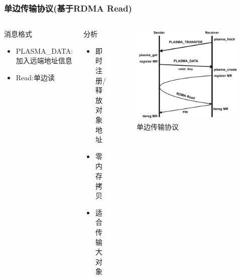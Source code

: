 \begin{frame}
	\frametitle{单边传输协议(基于RDMA Read)}
	\begin{columns}[onlytextwidth]
		\begin{block}{消息格式}
			\begin{itemize}
				\item PLASMA\_DATA:\\加入远端地址信息
				\item Read:单边读
			\end{itemize}
		\end{block}
		\begin{block}{分析}
			\begin{itemize}
				\item 即时注册/释放对象地址
				\item 零内存拷贝
				\item 适合传输大对象
			\end{itemize}
		\end{block}
		\begin{figure}
			\centering
			\includegraphics[width=\textwidth]{image/chap03/read_protocol.png}
			\caption{单边传输协议}
		\end{figure}
	\end{columns}
\end{frame}